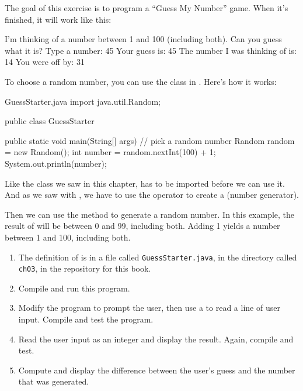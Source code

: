 \begin{exercise}  %
\label{guess}

The goal of this exercise is to program a ``Guess My Number'' game.
When it's finished, it will work like this:

\begin{stdout}
I'm thinking of a number between 1 and 100
(including both). Can you guess what it is?
Type a number: 45
Your guess is: 45
The number I was thinking of is: 14
You were off by: 31
\end{stdout}

To choose a random number, you can use the  class in .
Here's how it works:


\begin{trinket}{GuessStarter.java}
import java.util.Random;

public class GuessStarter {

    public static void main(String[] args) {
        // pick a random number
        Random random = new Random();
        int number = random.nextInt(100) + 1;
        System.out.println(number);
    }
}
\end{trinket}


Like the  class we saw in this chapter,  has to be imported before we can use it.
And as we saw with , we have to use the  operator to create a  (number generator).

Then we can use the method  to generate a random number.
In this example, the result of  will be between 0 and 99, including both.
Adding 1 yields a number between 1 and 100, including both.

\begin{enumerate}

\item The definition of  is in a file called {\tt GuessStarter.java}, in the directory called {\tt ch03}, in the repository for this book.

\item Compile and run this program.

\item Modify the program to prompt the user, then use a  to read a line of user input.
Compile and test the program.

\item Read the user input as an integer and display the result.
Again, compile and test.

\item Compute and display the difference between the user's guess and the number that was generated.

\end{enumerate}

\end{exercise}

